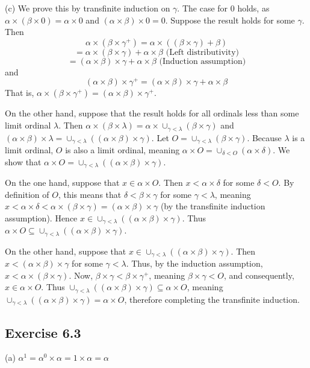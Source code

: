 \documentclass{article}
\theoremstyle{definition}
\begin{document}
(c) We prove this by transfinite induction on $\gamma$. The case for $0$ holds, as 
$\alpha\times(\beta\times 0)=\alpha\times 0$ and $(\alpha\times\beta)\times 0=0$. 
Suppose the result holds for some 
$\gamma$. Then 
\[ \alpha\times(\beta\times\gamma^+)=\alpha\times((\beta\times\gamma)+\beta) \]
\[ =\alpha\times(\beta\times\gamma)+\alpha\times\beta\textrm{ (Left distributivity)} \]
\[ =(\alpha\times\beta)\times\gamma+\alpha\times\beta\textrm{ (Induction assumption)} \]
and
\[ (\alpha\times\beta)\times\gamma^+=(\alpha\times\beta)\times\gamma+\alpha\times\beta \]
That is, $\alpha\times(\beta\times\gamma^+)=(\alpha\times\beta)\times\gamma^+$.

On the other hand, suppose that the result holds for all ordinals less than some limit ordinal $\lambda$. Then 
$\alpha\times(\beta\times\lambda)=\alpha\times\cup_{\gamma<\lambda}(\beta\times\gamma)$ and 
$(\alpha\times\beta)\times\lambda=\cup_{\gamma<\lambda}((\alpha\times\beta)\times\gamma)$. Let 
$O=\cup_{\gamma<\lambda}(\beta\times\gamma)$. Because $\lambda$ is a limit ordinal, $O$ is also a limit 
ordinal, meaning 
$\alpha\times O=\cup_{\delta<O}(\alpha\times\delta)$. We show that 
$\alpha\times O=\cup_{\gamma<\lambda}((\alpha\times\beta)\times\gamma)$.

On the one hand, suppose that $x\in\alpha\times O$. Then $x<\alpha\times\delta$ for some $\delta<O$. By 
definition of $O$, this means that $\delta<\beta\times\gamma$ for some $\gamma<\lambda$, meaning 
$x<\alpha\times\delta<\alpha\times(\beta\times\gamma)=(\alpha\times\beta)\times\gamma$ (by the transfinite induction assumption). 
Hence $x\in\cup_{\gamma<\lambda}((\alpha\times\beta)\times\gamma)$. Thus 
$\alpha\times O\subseteq\cup_{\gamma<\lambda}((\alpha\times\beta)\times\gamma)$.

On the other hand, suppose that $x\in\cup_{\gamma<\lambda}((\alpha\times\beta)\times\gamma)$. Then 
$x<(\alpha\times\beta)\times\gamma$ for some $\gamma<\lambda$. Thus, by the induction assumption, 
$x<\alpha\times(\beta\times\gamma)$. Now, $\beta\times\gamma<\beta\times\gamma^+$, meaning 
$\beta\times\gamma<O$, and consequently, $x\in\alpha\times O$. Thus 
$\cup_{\gamma<\lambda}((\alpha\times\beta)\times\gamma)\subseteq\alpha\times O$, meaning 
$\cup_{\gamma<\lambda}((\alpha\times\beta)\times\gamma)=\alpha\times O$, therefore completing the 
transfinite induction.

\subsection*{Exercise 6.3}
(a) $\alpha^1=\alpha^0\times\alpha=1\times\alpha=\alpha$
\end{document}
